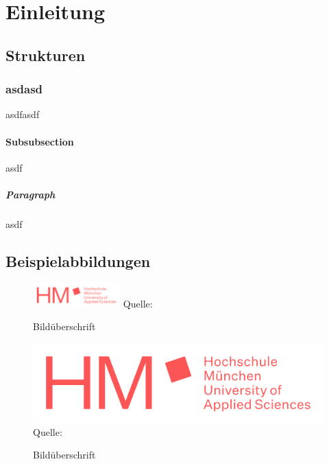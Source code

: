 \chapter{Einleitung}

\section{Strukturen}

\subsection{asdasd}
asdfasdf

\subsubsection{Subsubsection}
asdf

\paragraph{\rmfamily\bfseries Paragraph}
asdf

\section{Beispielabbildungen}

\lipsum[10]

\begin{figure}
\caption{Bildüberschrift}
\centering
\includegraphics[width=0.3\textwidth]{content/pictures/hm}
Quelle: \cite{s11wasml}
\label{pic:bild2}
\end{figure}

\lipsum[10]

\begin{figure}
\caption{Bildüberschrift}
\includegraphics[width=1\textwidth]{content/pictures/hm}
Quelle: \cite{s11wasml}
\label{pic:bild1}
\end{figure}

